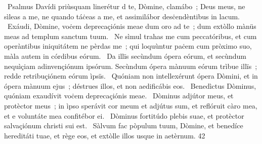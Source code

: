 {~Psalmus Davídi priùsquam linerétur}
{%
d te, Dòmine, clamábo~; Deus meus, ne sìleas a me, ne quando táċeas a me, et assimilábor desċendèntibus in lacum. 
~Exáudi, Dòmine, voċem deprecaçiónis meae dum oro ad te~; dum extòllo mànüs meas ad templum sanctum tuum. 
~Ne sìmul trahas me cum peccatóribus, et cum operàntibus iniquitátem ne pèrdas me~; qui loquùntur paċem cum pròximo suo, màla autem in córdibus eórum. 
~Da illïs secùndum ópera eórum, et secùndum nequìçiam adinvençiónum ipsórum. Secùndum ópera mànuum eórum trìbue illïs~; redde retribuçiónem eórum ìpsïs. 
~Quóniam non intellexérunt ópera Dòmini, et in ópera mànuum ejus~; déstrues illos, et non aedificábis eos. 
~Benedìctus Dòminus, quóniam exaudívit voċem deprecaçiónis meae. 
~Dòminus adjútor meus, et protèctor meus~; in ìpso sperávit cor meum et adjútus sum, et reflóruit càro mea, et e voluntáte mea confitébor ei. 
~Dòminus fortitúdo plebis suae, et protèctor salvaçiónum christi sui est. 
~Sàlvum fac pòpulum tuum, Dòmine, et benedíce hereditáti tuae, et rège eos, et extòlle illos usque in aetèrnum.}
{4}{2}
